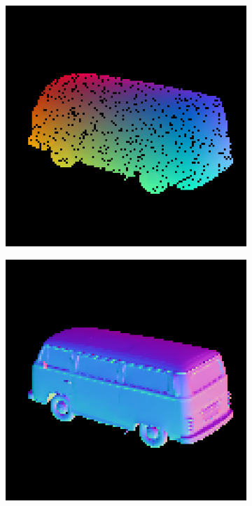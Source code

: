 \begin{figure}
	
	\begin{subfigure}[b]{0.24\linewidth}
		\includegraphics[width=\linewidth]{./Figures/gcnn_synthetic/fancy_eval_9_point_cloud_noise.png}
	\end{subfigure}
	\begin{subfigure}[b]{0.24\linewidth}
		\includegraphics[width=\linewidth]{./Figures/gcnn_synthetic/fancy_eval_9_groundtruth.png}

\end{subfigure}
\end{figure}
